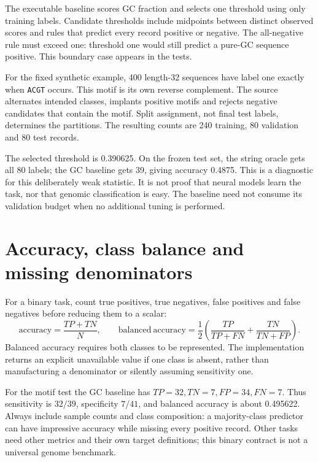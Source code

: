 The executable baseline scores GC fraction and selects one threshold using
only training labels. Candidate thresholds include midpoints between
distinct observed scores and rules that predict every record positive or
negative. The all-negative rule must exceed one: threshold one would still
predict a pure-GC sequence positive. This boundary case appears in the tests.


For the fixed synthetic example, 400 length-32 sequences have label one
exactly when \texttt{ACGT} occurs. This motif is its own reverse complement.
The source alternates intended classes, implants positive motifs and rejects
negative candidates that contain the motif. Split assignment, not final
test labels, determines the partitions. The resulting counts are 240 training,
80 validation and 80 test records.

The selected threshold is 0.390625. On the frozen test set, the string oracle
gets all 80 labels; the GC baseline gets 39, giving accuracy 0.4875.
This is a diagnostic for this deliberately weak statistic. It is not proof
that neural models learn the task, nor that genomic classification is easy.
The baseline need not consume its validation budget when no additional tuning
is performed.

\section{Accuracy, class balance and missing denominators}
For a binary task, count true positives, true negatives, false positives and
false negatives before reducing them to a scalar:
\[
\mathrm{accuracy}=\frac{TP+TN}{N},\qquad
\mathrm{balanced\ accuracy}=
\frac12\left(\frac{TP}{TP+FN}+\frac{TN}{TN+FP}\right).
\]
Balanced accuracy requires both classes to be represented.
The implementation returns an explicit unavailable value if one class is absent,
rather than manufacturing a denominator or silently assuming sensitivity one.

For the motif test the GC baseline has $TP=32,TN=7,FP=34,FN=7$.
Thus sensitivity is $32/39$, specificity $7/41$, and balanced accuracy
is about 0.495622. Always include sample counts and class composition:
a majority-class predictor can have impressive accuracy while missing
every positive record. Other tasks need other metrics and their own target
definitions; this binary contract is not a universal genome benchmark.


